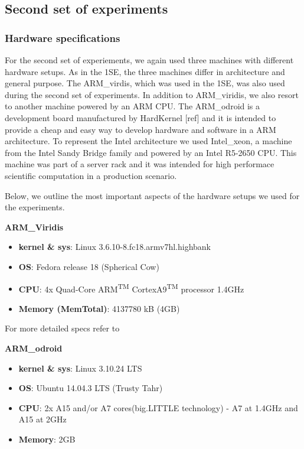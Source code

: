 \subsection{Second set of experiments}

\subsubsection*{Hardware specifications}

For the second set of experiements, we again used three machines with different hardware setups. As in the 1SE, the three machines differ in architecture and general purpose. The ARM\_virdis, which was used in the 1SE, was also used during the second set of experiments. In addition to ARM\_viridis, we also resort to another machine powered by an ARM CPU. The ARM\_odroid is a development board manufactured by HardKernel [ref] and it is intended to provide a cheap and easy way to develop hardware and software in a ARM architecture. To represent the Intel architecture we used Intel\_xeon, a machine from the Intel Sandy Bridge family and powered by an Intel R5-2650 CPU. This machine was part of a server rack and it was intended for high performace scientific computation in a production scenario.

Below, we outline the most important aspects of the hardware setups we used for the experiments.

\vspace{10mm}
\textbf{ARM\_Viridis}
\begin{itemize}
  \item[] \textbf{kernel \& sys}:  Linux  3.6.10-8.fc18.armv7hl.highbank
  \item[] \textbf{OS}: Fedora release 18 (Spherical Cow)
  \item[] \textbf{CPU}:    4x Quad-Core ARM\textsuperscript{TM} CortexA9\textsuperscript{TM} processor \@1.4GHz
  \item[] \textbf{Memory  (MemTotal)}:        4137780 kB (4GB) 
\end{itemize}

For more detailed specs refer to \cite{viridis_specs}


\vspace{10mm}
\textbf{ARM\_odroid}
\begin{itemize}
  \item[] \textbf{kernel \& sys}:  Linux 3.10.24 LTS
  \item[] \textbf{OS}: Ubuntu 14.04.3 LTS (Trusty Tahr)
  \item[] \textbf{CPU}: 2x A15 and/or A7 cores(big.LITTLE technology) - A7 at 1.4GHz and A15 at 2GHz
  \item[] \textbf{Memory}:        2GB
\end{itemize}

